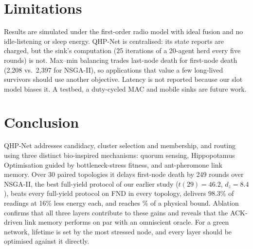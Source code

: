\section{Limitations}
Results are simulated under the first-order radio model with ideal fusion and no idle-listening or sleep energy. QHP-Net is centralised: its state reports are charged, but the sink's computation (25 iterations of a 20-agent herd every five rounds) is not. Max--min balancing trades last-node death for first-node death (2,208 vs.\ 2,397 for NSGA-II), so applications that value a few long-lived survivors should use another objective. Latency is not reported because our slot model biases it. A testbed, a duty-cycled MAC and mobile sinks are future work.

\section{Conclusion}
QHP-Net addresses candidacy, cluster selection and membership, and routing using three distinct bio-inspired mechanisms: quorum sensing, Hippopotamus Optimisation guided by bottleneck-stress fitness, and ant-pheromone link memory. Over 30 paired topologies it delays first-node death by 249 rounds over NSGA-II, the best full-yield protocol of our earlier study ($t(29)=46.2$, $d_z=8.4$), beats every full-yield protocol on FND in every topology, delivers 98.3\% of readings at 16\% less energy each, and reaches \fndfrac\% of a physical bound. Ablation confirms that all three layers contribute to these gains and reveals that the ACK-driven link memory performs on par with an omniscient oracle. For a green network, lifetime is set by the most stressed node, and every layer should be optimised against it directly.
